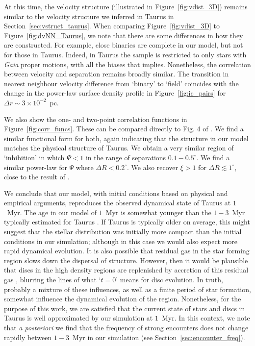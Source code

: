 \documentclass{aa}
\begin{document}
At this time, the velocity structure (illustrated in Figure~\ref{fig:vdist_3D}) remains similar to the velocity structure we inferred in Taurus in Section~\ref{sec:vstruct_taurus}. When comparing Figure~\ref{fig:vdist_3D} to Figure~\ref{fig:dvNN_Taurus}, we note that there are some differences in how they are constructed. For example, close binaries are complete in our model, but not for those in Taurus. Indeed, in Taurus the sample is restricted to only stars with \textit{Gaia} proper motions, with all the biases that implies. Nonetheless, the correlation between velocity and separation remains broadly similar. The transition in nearest neighbour velocity difference from `binary' to `field' coincides with the change in the power-law surface density profile in Figure~\ref{fig:ic_pairs} for $\Delta r \sim 3\times  10^{-2}$~pc.

We also show the one- and two-point correlation functions in Figure~\ref{fig:corr_funcs}. These can be compared directly to Fig. 4 of \citet{Joncour17}. We find a similar functional form for both, again indicating that the structure in our model matches the physical structure of Taurus. We obtain a very similar region of `inhibition' in which $\Psi<1$ in the range of separations $0.1-0.5^\circ$. We find a similar power-law for $\Psi$ where $\Delta R < 0.2^\circ$. We also recover $\xi>1$ for $\Delta R \lesssim 1^\circ$, close to the result of \cite{Joncour17}. 

We conclude that our model, with initial conditions based on physical and empirical arguments, reproduces the observed dynamical state of Taurus at $1$~Myr. The age in our model of $1$~Myr is somewhat younger than the $1-3$~Myr typically estimated for Taurus \citep[e.g.][]{Luhman23}. If Taurus is typically older on average, this might suggest that the stellar distribution was initially more compact than the initial conditions in our simulation; although in this case we would also expect more rapid dynamical evolution. It is also possible that residual gas in the star forming region slows down the dispersal of structure. However, then it would be plausible that discs in the high density regions are replenished by accretion of this residual gas \citep[e.g.][]{Kuffmeier20}, blurring the lines of what `$t=0$' means for disc evolution. In truth, probably a mixture of these influences, as well as a finite period of star formation, somewhat influence the dynamical evolution of the region. Nonetheless, for the purpose of this work, we are satisfied that the current state of stars and discs in Taurus is well approximated by our simulation at $1$~Myr. In this context, we note that \textit{a posteriori} we find that the frequency of strong encounters does not change rapidly between $1-3$~Myr in our simulation (see Section~\ref{sec:encounter_freq}).  
\end{document}
